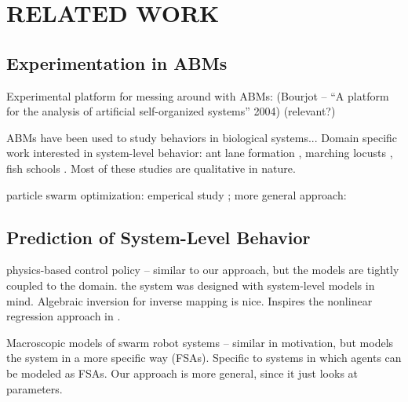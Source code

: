 \chapter{RELATED WORK}
\thispagestyle{plain}

\label{RelatedWork}


\section{Experimentation in ABMs}
\label{sec:abmexp}
Experimental platform for messing around with ABMs: (Bourjot -- ``A platform for the analysis of artificial self-organized systems'' 2004) (relevant?)

ABMs have been used to study behaviors in biological systems... Domain specific work interested in system-level behavior: ant lane formation \cite{couzin2003sol}, marching locusts \cite{buhl2006dom}, fish schools \cite{parrish2002sof}. Most of these studies are qualitative in nature.

particle swarm optimization: emperical study \cite{shi1998parameter}; more general approach: \cite{van2006study}

\section{Prediction of System-Level Behavior}

physics-based control policy \cite{spears2004dpb} -- similar to our approach, but the models are tightly coupled to the domain. the system was designed with system-level models in mind. Algebraic inversion for inverse mapping is nice. Inspires the nonlinear regression approach in \fw.

Macroscopic models of swarm robot systems \cite{lerman2002mmf}\cite{lerman2005rpm} -- similar in motivation, but models the system in a more specific way (FSAs). Specific to systems in which agents can be modeled as FSAs. Our approach is more general, since it just looks at parameters.



